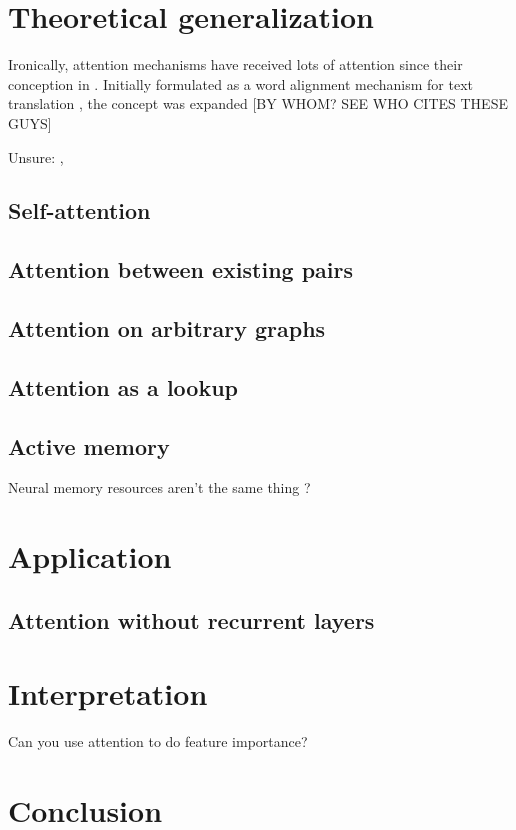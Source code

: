 \documentclass{article}
\begin{document}
\section{Theoretical generalization}

Ironically, attention mechanisms have received lots of attention since their conception in \citeyear{joint_align_translate}. Initially formulated as a word alignment mechanism for text translation \cite{joint_align_translate}, the concept was expanded [BY WHOM? SEE WHO CITES THESE GUYS]

\cite{listen_attend_spell}

Unsure: \cite{show_observe_tell}, \cite{draw}

\subsection{Self-attention}

\cite{self_attentive_embedding}

\subsection{Attention between existing pairs}

\cite{natural_language_inference}

\subsection{Attention on arbitrary graphs}

\cite{graphs}

\subsection{Attention as a lookup}

\subsection{Active memory}

\cite{active_memory}

Neural memory resources aren't the same thing \cite{neural_turing}?

\section{Application}

\subsection{Attention without recurrent layers}

\cite{attn_all_you_need}

\section{Interpretation}

Can you use attention to do feature importance?

\section{Conclusion}




\end{document}

